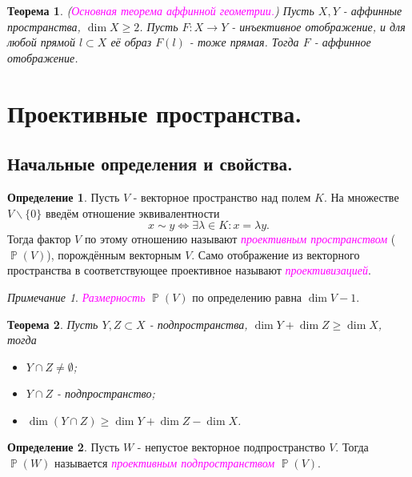\documentclass[a4paper,100pt]{article}
\theoremstyle{indented}
\newtheorem{theorem}{Теорема}
\theoremstyle{definition}
\newtheorem{defn}{Определение}
\theoremstyle{remark}
\newtheorem{remark}{Примечание}
\DeclareMathOperator{\ra}{\rightarrow}
\DeclareMathOperator{\Llra}{\Longleftrightarrow}
\DeclareMathOperator{\PP}{\mathbb{P}}
\begin{document}
\begin{theorem}
    (\textit{\textcolor{magenta}{\hypertarget{s31}{Основная теорема аффинной геометрии.}}}) Пусть $X, Y$ - аффинные пространства, $\dim X \geq 2$. Пусть $F: X\ra Y$ - инъективное отображение, и для любой прямой $l\subset X$ её образ $F(l)$ - тоже прямая. Тогда $F$ - аффинное отображение.
\end{theorem}

\section{Проективные пространства.}

\subsection{Начальные определения и свойства.}

\begin{defn}
    Пусть $V$ - векторное пространство над полем $K$. На множестве $V \backslash \{0\}$ введём отношение эквивалентности
    \[
        x \sim y \Llra \exists \lambda \in K: x = \lambda y. 
    \]
    Тогда фактор $V$ по этому отношению называют \textit{\textcolor{magenta}{\hypertarget{s32}{проективным пространством}}} ($\PP(V)$), порождённым векторным $V$. Само отображение из векторного пространства в соответствующее проективное называют \textit{\textcolor{magenta}{\hypertarget{s33}{проективизацией}}}.
\end{defn}

\begin{remark}
    \textit{\textcolor{magenta}{\hypertarget{s34}{Размерность}}} $\PP(V)$ по определению равна $\dim V -1$. 
\end{remark}

\begin{theorem}
    Пусть $Y, Z\subset X$ - подпространства, $\dim Y + \dim Z \geq \dim X$, тогда

    \begin{itemize}
        \item $Y\cap Z \neq \emptyset$; 
        \item $Y \cap Z$ - подпространство; 
        \item $\dim(Y \cap Z)\geq \dim Y + \dim Z - \dim X$. 
    \end{itemize}
\end{theorem}

\begin{defn}
    Пусть $W$ - непустое векторное подпространство $V$. Тогда $\PP(W)$ называется \textit{\textcolor{magenta}{\hypertarget{s35}{проективным подпространством}}} $\PP(V)$.
\end{defn}
\end{document}
